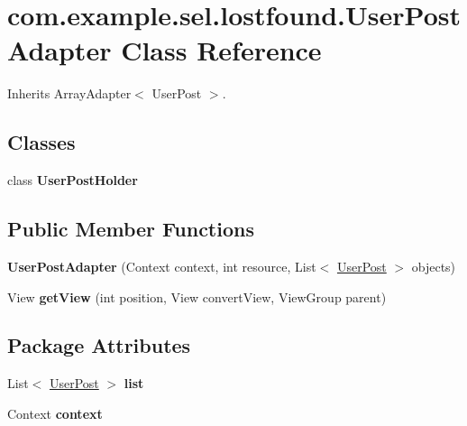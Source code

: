 \hypertarget{classcom_1_1example_1_1sel_1_1lostfound_1_1UserPostAdapter}{\section{com.\-example.\-sel.\-lostfound.\-User\-Post\-Adapter \-Class \-Reference}
\label{classcom_1_1example_1_1sel_1_1lostfound_1_1UserPostAdapter}
}


\-Inherits \-Array\-Adapter$<$ User\-Post $>$.

\subsection*{\-Classes}
\begin{DoxyCompactItemize}
\item 
class {\bfseries \-User\-Post\-Holder}
\end{DoxyCompactItemize}
\subsection*{\-Public \-Member \-Functions}
\begin{DoxyCompactItemize}
\item 
\hypertarget{classcom_1_1example_1_1sel_1_1lostfound_1_1UserPostAdapter_a8770784429d0552a7472193206396700}{{\bfseries \-User\-Post\-Adapter} (\-Context context, int resource, \-List$<$ \hyperlink{classcom_1_1example_1_1sel_1_1lostfound_1_1UserPost}{\-User\-Post} $>$ objects)}\label{classcom_1_1example_1_1sel_1_1lostfound_1_1UserPostAdapter_a8770784429d0552a7472193206396700}

\item 
\hypertarget{classcom_1_1example_1_1sel_1_1lostfound_1_1UserPostAdapter_ab3b3a8f8ee3bb0bf9a8a863209009395}{\-View {\bfseries get\-View} (int position, \-View convert\-View, \-View\-Group parent)}\label{classcom_1_1example_1_1sel_1_1lostfound_1_1UserPostAdapter_ab3b3a8f8ee3bb0bf9a8a863209009395}

\end{DoxyCompactItemize}
\subsection*{\-Package \-Attributes}
\begin{DoxyCompactItemize}
\item 
\hypertarget{classcom_1_1example_1_1sel_1_1lostfound_1_1UserPostAdapter_aab2d1adac92f633215f374dae4121b24}{\-List$<$ \hyperlink{classcom_1_1example_1_1sel_1_1lostfound_1_1UserPost}{\-User\-Post} $>$ {\bfseries list}}\label{classcom_1_1example_1_1sel_1_1lostfound_1_1UserPostAdapter_aab2d1adac92f633215f374dae4121b24}

\item 
\hypertarget{classcom_1_1example_1_1sel_1_1lostfound_1_1UserPostAdapter_a44c4d98ed12da072b0e7702a5bd7d3ac}{\-Context {\bfseries context}}\label{classcom_1_1example_1_1sel_1_1lostfound_1_1UserPostAdapter_a44c4d98ed12da072b0e7702a5bd7d3ac}

\end{DoxyCompactItemize}


